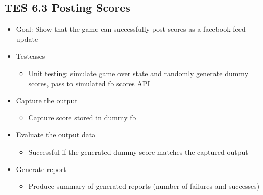 \subsection{TES 6.3 Posting Scores}
\begin{itemize}
\item Goal: Show that the game can successfully post scores as a facebook feed update

\item Testcases
\begin{itemize}
\item Unit testing: simulate game over state and randomly generate dummy scores, pass to simulated fb scores API
\end{itemize}

\item Capture the output
\begin{itemize}
\item Capture score stored in dummy fb
\end{itemize}

\item Evaluate the output data
\begin{itemize}
\item Successful if the generated dummy score matches the captured output
\end{itemize}

\item Generate report
\begin{itemize}
\item Produce summary of generated reports (number of failures and successes)
\end{itemize}
\end{itemize}

